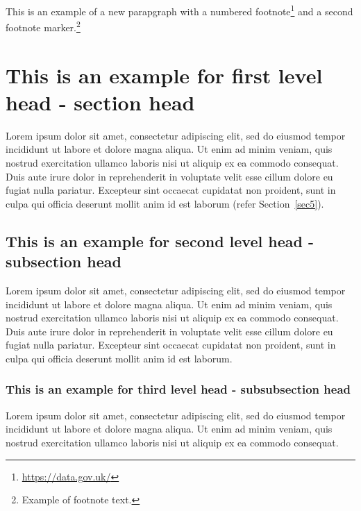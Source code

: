 \documentclass[unnumsec,webpdf,modern,large]{mam-authoring-template}%
\theoremstyle{thmstyleone}%
\theoremstyle{thmstyletwo}%
\theoremstyle{thmstylethree}%
\begin{document}
This is an example of a new parapgraph with a numbered footnote\footnote{\url{https://data.gov.uk/}} and a second footnote marker.\footnote{Example of footnote text.}



\section{This is an example for first level head - section head}\label{sec2}

Lorem ipsum dolor sit amet, consectetur adipiscing elit, sed do eiusmod tempor incididunt ut labore et dolore magna aliqua. Ut enim ad minim veniam, quis nostrud exercitation ullamco laboris nisi ut aliquip ex ea commodo consequat. Duis aute irure dolor in reprehenderit in voluptate velit esse cillum dolore eu fugiat nulla pariatur. Excepteur sint occaecat cupidatat non proident, sunt in culpa qui officia deserunt mollit anim id est laborum (refer Section~\ref{sec5}).

\subsection{This is an example for second level head - subsection head}\label{subsec1}

Lorem ipsum dolor sit amet, consectetur adipiscing elit, sed do eiusmod tempor incididunt ut labore et dolore magna aliqua. Ut enim ad minim veniam, quis nostrud exercitation ullamco laboris nisi ut aliquip ex ea commodo consequat. Duis aute irure dolor in reprehenderit in voluptate velit esse cillum dolore eu fugiat nulla pariatur. Excepteur sint occaecat cupidatat non proident, sunt in culpa qui officia deserunt mollit anim id est laborum.

\subsubsection{This is an example for third level head - subsubsection head}\label{subsubsec1}

Lorem ipsum dolor sit amet, consectetur adipiscing elit, sed do
eiusmod tempor incididunt ut labore et dolore magna aliqua. Ut enim ad minim veniam, quis nostrud exercitation ullamco laboris nisi ut aliquip ex ea commodo consequat. %
\end{document}
